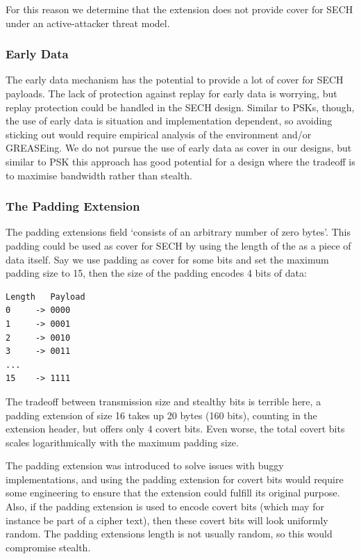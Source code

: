For this reason we determine that the  extension does
not provide cover for \ac{SECH} under an active-attacker threat model.

\subsubsection{Early Data}
The early data mechanism has the potential to provide a lot of
cover for \ac{SECH} payloads.
The lack of protection against replay for early data is worrying,
but replay protection could be handled in the \ac{SECH} design.
Similar to \acp{PSK}, though, the use of early data is situation and
implementation dependent,
so avoiding sticking out would require empirical analysis of the environment
and/or \ac{GREASE}ing.
We do not pursue the use of early data as cover in our designs,
but similar to \ac{PSK} this approach has good potential
for a design where the tradeoff is to maximise bandwidth rather than stealth.

\subsubsection{The Padding Extension}
The padding extensions  field `consists of an arbitrary number of zero bytes'.
This padding could be used as cover for SECH by using the length of the  as a piece
of data itself. Say we use padding as cover for some bits and set the maximum padding size to 15, then
the size of the padding encodes 4 bits of data:
\begin{verbatim}
Length   Payload
0     -> 0000
1     -> 0001
2     -> 0010
3     -> 0011
...
15    -> 1111
\end{verbatim}

The tradeoff between transmission size and stealthy bits is terrible here,
a padding extension of size 16 takes up 20 bytes (160 bits),
counting in the extension header, but offers only 4 covert bits.
Even worse, the total covert bits scales logarithmically with the maximum padding size.

The padding extension was introduced to solve issues with buggy implementations, and using
the padding extension for covert bits would require some engineering to ensure that the extension
could fulfill its original purpose.
Also, if the padding extension is used to encode covert bits (which may for instance be part of a cipher text),
then these covert bits will look uniformly random.
The padding extensions length is not usually random, so this would compromise stealth.


